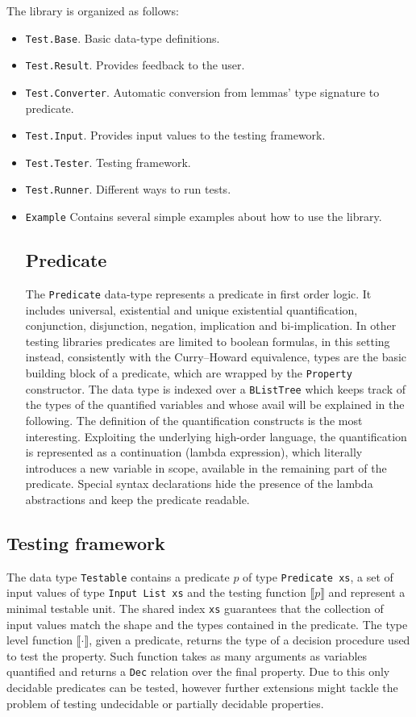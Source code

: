 \documentclass[10pt,a4paper]{article}
\begin{document}
The library is organized as follows:
\begin{itemize}
	\item \texttt{Test.Base}. Basic data-type definitions.
	\item \texttt{Test.Result}. Provides feedback to the user.
	\item \texttt{Test.Converter}. Automatic conversion from lemmas' type signature to predicate.
	\item \texttt{Test.Input}. Provides input values to the testing framework.
	\item \texttt{Test.Tester}. Testing framework.
	\item \texttt{Test.Runner}. Different ways to run tests.
	\item \texttt{Example} Contains several simple examples about how to use the library.
	
\subsection{Predicate}
The \texttt{Predicate} data-type represents a predicate in first order logic.
It includes universal, existential and unique existential quantification, conjunction, disjunction, negation, implication and bi-implication.
In other testing libraries predicates are limited to boolean formulas, in this setting instead, consistently with the Curry–Howard equivalence, types are the basic building block of a predicate, which are wrapped by the \texttt{Property} constructor.
The data type is indexed over a \texttt{BListTree} which keeps track of the types of the quantified variables and whose avail will be explained in the following.
The definition of the quantification constructs is the most interesting.
Exploiting the underlying high-order language, the quantification is represented as a continuation (lambda expression), which literally introduces a new variable in scope, available in the remaining part of the predicate.
Special syntax declarations hide the presence of the lambda abstractions and keep the predicate readable.


\end{itemize}

\subsection{Testing framework}
The data type \texttt{Testable} contains a predicate $p$ of type \texttt{Predicate xs}, a set of input values of type \texttt{Input List xs} and the testing function $\llbracket p \rrbracket$ and represent a minimal testable unit. The shared index \texttt{xs} guarantees that the collection of input values match the shape and the types contained in the predicate.
The type level function $\llbracket \cdot \rrbracket$, given a predicate, returns the type of a decision procedure used to test the property.
Such function takes as many arguments as variables quantified and returns a \texttt{Dec} relation over the final property. Due to this only decidable predicates can be tested, however further extensions might tackle the problem of testing undecidable or partially decidable properties.
\end{document}

